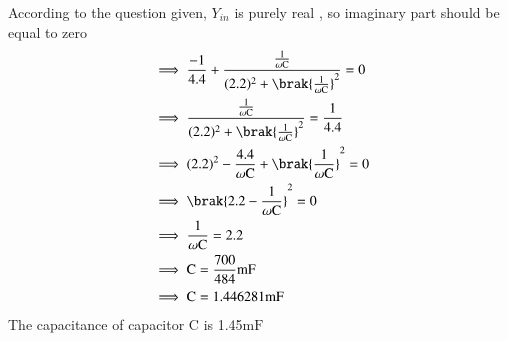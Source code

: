 \documentclass[a4,12pt,onecolumn]{IEEEtran}
\begin{document}
According to the question given, $Y_{in}$ is purely real , so imaginary part should be equal to zero\\
\begin{align}
&\implies  \frac{-1}{4.4}+\frac{\frac{1}{\omega\text{C}}}{(2.2)^2+\brak{\frac{1}{\omega\text{C}}}^2} = 0\\
&\implies  \frac{\frac{1}{\omega\text{C}}}{(2.2)^2+\brak{\frac{1}{\omega\text{C}}}^2}=\frac{1}{4.4}\\
&\implies  (2.2)^2-\frac{4.4}{\omega\text{C}}+\brak{\frac{1}{\omega\text{C}}}^2=0\\
&\implies  \brak{2.2-\frac{1}{\omega\text{C}}}^2=0\\
&\implies  \frac{1}{\omega\text{C}}=2.2\\
&\implies  \text{C}=\frac{700}{484}\text{mF}\\
&\implies  \text{C}=1.446281\text{mF}
\end{align}
The capacitance of capacitor $\text{C}$ is 1.45$\text{mF}$
\end{document}
